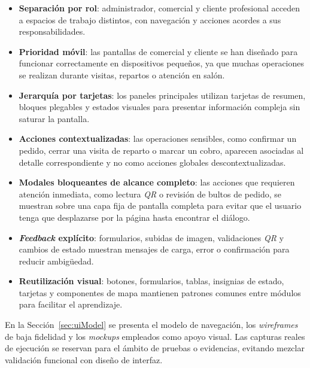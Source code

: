 \begin{itemize}
    \item \textbf{Separación por rol}: administrador, comercial y cliente profesional acceden a espacios de trabajo distintos, con navegación y acciones acordes a sus responsabilidades.
    \item \textbf{Prioridad móvil}: las pantallas de comercial y cliente se han diseñado para funcionar correctamente en dispositivos pequeños, ya que muchas operaciones se realizan durante visitas, repartos o atención en salón.
    \item \textbf{Jerarquía por tarjetas}: los paneles principales utilizan tarjetas de resumen, bloques plegables y estados visuales para presentar información compleja sin saturar la pantalla.
    \item \textbf{Acciones contextualizadas}: las operaciones sensibles, como confirmar un pedido, cerrar una visita de reparto o marcar un cobro, aparecen asociadas al detalle correspondiente y no como acciones globales descontextualizadas.
    \item \textbf{Modales bloqueantes de alcance completo}: las acciones que requieren atención inmediata, como lectura \textit{QR} o revisión de bultos de pedido, se muestran sobre una capa fija de pantalla completa para evitar que el usuario tenga que desplazarse por la página hasta encontrar el diálogo.
    \item \textbf{\textit{Feedback} explícito}: formularios, subidas de imagen, validaciones \textit{QR} y cambios de estado muestran mensajes de carga, error o confirmación para reducir ambigüedad.
    \item \textbf{Reutilización visual}: botones, formularios, tablas, insignias de estado, tarjetas y componentes de mapa mantienen patrones comunes entre módulos para facilitar el aprendizaje.
\end{itemize}

En la Sección~\ref{sec:uiModel} se presenta el modelo de navegación, los \textit{wireframes} de baja fidelidad y los \textit{mockups} empleados como apoyo visual. Las capturas reales de ejecución se reservan para el ámbito de pruebas o evidencias, evitando mezclar validación funcional con diseño de interfaz.
